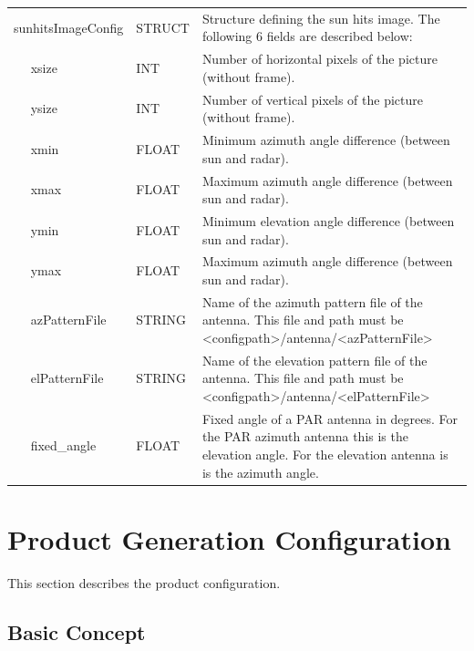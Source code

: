 \documentclass[a4paper,11pt,pdftex,twoside]{scrartcl}
\begin{document}
{{{\begin{longtable}{p{}p{}p{}}
sunhitsImageConfig     & STRUCT    & Structure defining the sun hits image. The following 6 fields are described below:\\
$\quad$ xsize      & INT      & Number of horizontal pixels of the picture (without frame).\\
$\quad$ ysize      & INT    & Number of vertical pixels of the picture (without frame).\\
$\quad$ xmin      & FLOAT  & Minimum azimuth angle difference (between sun and radar).\\
$\quad$ xmax     & FLOAT  & Maximum azimuth angle difference (between sun and radar).\\
$\quad$ ymin      & FLOAT  & Minimum elevation angle difference (between sun and radar).\\
$\quad$ ymax     & FLOAT  & Maximum azimuth angle difference (between sun and radar).\\


$\quad$ azPatternFile & STRING & Name of the azimuth pattern file of the antenna. This file and
                                 path must be
                                 <configpath>/antenna/<azPatternFile>\\
$\quad$ elPatternFile & STRING & Name of the elevation pattern file of the antenna. This file and
                                 path must be
                                 <configpath>/antenna/<elPatternFile>\\
$\quad$ fixed\_angle  & FLOAT  & Fixed angle of a PAR antenna in degrees. For the PAR azimuth
                                 antenna this is the elevation angle. For the elevation antenna
                                 is is the azimuth angle.\\
\end{longtable}


\newpage

\section{Product Generation Configuration}
\label{sec_products}

This section describes the product configuration.

\subsection{Basic Concept}

}}}
\end{document}
